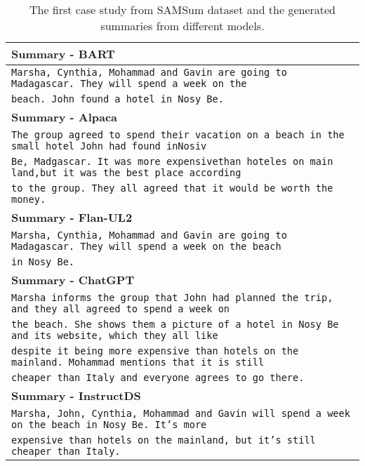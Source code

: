 \documentclass[11pt]{article}
\begin{document}
\begin{table*}[t]
\begin{adjustbox}{width=1.00\textwidth,center}
\begin{tabular}{ | l | }
        \textbf{Summary - BART} \\ \hline 
        \texttt{Marsha, Cynthia, Mohammad and Gavin are going to Madagascar. They will spend a week on the } \\ 
        \texttt{beach. John found a hotel in Nosy Be.} \\ \hline \hline
        
        \textbf{Summary - Alpaca} \\ \hline
        \texttt{The group agreed to spend their vacation on a beach in the small hotel John had found inNosiv } \\ 
        \texttt{Be, Madgascar. It was more expensivethan hoteles on main land,but it was the best place according } \\
        \texttt{to the group. They all agreed that it would be worth the money.} \\ \hline \hline
        
        \textbf{Summary - Flan-UL2} \\ \hline
        \texttt{Marsha, Cynthia, Mohammad and Gavin are going to Madagascar. They will spend a week on the beach} \\
        \texttt{in Nosy Be.} \\ \hline \hline
        
        \textbf{Summary - ChatGPT} \\ \hline
        \texttt{Marsha informs the group that John had planned the trip, and they all agreed to spend a week on } \\ 
        \texttt{the beach. She shows them a picture of a hotel in Nosy Be and its website, which they all like} \\
        \texttt{despite it being more expensive than hotels on the mainland. Mohammad mentions that it is still} \\
        \texttt{cheaper than Italy and everyone agrees to go there.} \\ \hline \hline
        
        \textbf{Summary - InstructDS} \\ \hline
        \texttt{Marsha, John, Cynthia, Mohammad and Gavin will spend a week on the beach in Nosy Be. It's more } \\
        \texttt{expensive than hotels on the mainland, but it's still cheaper than Italy.} \\
        \bottomrule
        \end{tabular}
        \end{adjustbox}
        \caption{The first case study from SAMSum dataset and the generated summaries from different models.}
        \label{tab:SAMSum_examples1}
    \end{table*}
\end{document}
